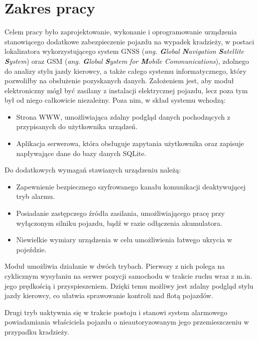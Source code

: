 \section{Zakres pracy}
\label{project_sketch}
Celem pracy było zaprojektowanie, wykonanie i oprogramowanie urządzenia stanowiącego dodatkowe zabezpieczenie pojazdu na wypadek kradzieży, w postaci lokalizatora wykorzystującego system GNSS (\textit{ang. \textbf{G}lobal \textbf{N}avigation \textbf{S}atellite \textbf{S}ystem}) oraz GSM (\textit{ang. \textbf{G}lobal \textbf{S}ystem for \textbf{M}obile Communications}), zdolnego do analizy stylu jazdy kierowcy, a także całego systemu informatycznego, który pozwoliłby na obsłużenie pozyskanych danych. Założeniem jest, aby moduł elektroniczny mógł być zasilany z instalacji elektrycznej pojazdu, lecz poza tym był od niego całkowicie niezależny. Poza nim, w skład systemu wchodzą:

\begin{itemize}
\item Strona WWW, umożliwiająca zdalny podgląd danych pochodzących z przypisanych do użytkownika urządzeń.
\item Aplikacja serwerowa, która obsługuje zapytania użytkownika oraz zapisuje napływające dane do bazy danych SQLite.
\end{itemize}

Do dodatkowych wymagań stawianych urządzeniu należą:

\begin{itemize}
\item Zapewnienie bezpiecznego szyfrowanego kanału komunikacji deaktywującej tryb alarmu.
\item Posiadanie zastępczego źródła zasilania, umożliwiającego pracę przy wyłączonym silniku pojazdu, bądź w razie odłączenia akumulatora.
\item Niewielkie wymiary urządzenia w celu umożliwienia łatwego ukrycia w pojeździe. 
\end{itemize}

Moduł umożliwia działanie w dwóch trybach. Pierwszy z nich polega na cyklicznym wysyłaniu na serwer pozycji samochodu w trakcie ruchu wraz z m.in. jego prędkością i przyspieszeniem. Dzięki temu możliwy jest zdalny podgląd stylu jazdy kierowcy, co ułatwia sprawowanie kontroli nad flotą pojazdów.

Drugi tryb uaktywnia się w trakcie postoju i stanowi system alarmowego powiadamiania właściciela pojazdu o nieautoryzowanym jego przemieszczeniu w przypadku kradzieży.

